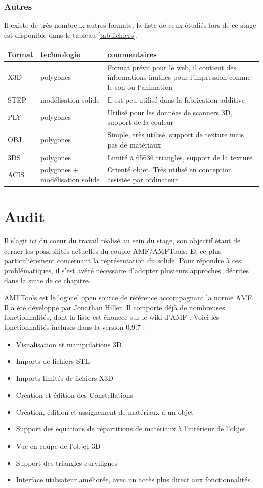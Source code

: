 \documentclass{tnreport}
\begin{document}
\subsection{Autres}
Il existe de très nombreux autres formats, la liste de ceux étudiés lors de ce stage est disponible dans le tableau \ref{tab:fichiers}.\\

\begin{tabular}{|m{2cm}|m{4cm}|m{7cm}|}
\label{tab:fichiers}
   Format & technologie & commentaires\tabularnewline
   \hline
   X3D & polygones & Format prévu pour le web, il contient des informations inutiles pour l'impression comme le son ou l'animation \tabularnewline
   \hline
   STEP & modélisation solide & Il est peu utilisé dans la fabrication additive\tabularnewline
   \hline
   PLY & polygones & Utilisé pour les données de scanners 3D, support de la couleur\tabularnewline
   \hline
   OBJ & polygones & Simple, très utilisé, support de texture mais pas de matériaux\tabularnewline
   \hline
   3DS & polygones & Limité à 65636 triangles, support de la texture\tabularnewline
   \hline
   ACIS & polygones + modélisation solide & Orienté objet. Très utilisé en conception assistée par ordinateur\tabularnewline
   \hline
\end{tabular}
\cleardoublepage



\chapter{Audit}

Il s'agit ici du coeur du travail réalisé au sein du stage, son objectif étant de cerner les possibilités actuelles du couple AMF/AMFTools. Et ce plus particulièrement concernant la représentation du solide. Pour répondre à ces problématiques, il s'est avéré nécessaire d'adopter plusieurs approches, décrites dans la suite de ce chapitre.

AMFTools est le logiciel open source de référence accompagnant la norme AMF. Il a été développé par Jonathan Hiller. Il comporte déjà de nombreuses fonctionnalités, dont la liste est énoncée sur le wiki d'AMF \cite{AMFwikispacessoft}. Voici les fonctionnalités incluses dans la version 0.9.7 :
\begin{itemize}
  \item Visualisation et manipulations 3D 
  \item Imports de fichiers STL
  \item Imports limités de fichiers X3D 
  \item Création et édition des Constellations
  \item Création, édition et assignement de matériaux à un objet
  \item Support des équations de répartitions de matériaux à l'intérieur de l'objet
  \item Vue en coupe de l'objet 3D
  \item Support des triangles curvilignes
  \item Interface utilisateur améliorée, avec un accès plus direct aux fonctionnalités.
\end{itemize}
\end{document}
